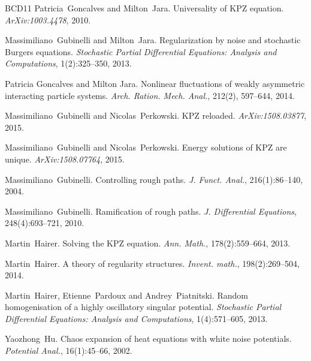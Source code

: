 \documentclass[a4paper,11pt]{article}
\newcommand{\tmtextit}[1]{{\itshape{#1}}}
\begin{document}
\begin{thebibliography}{BCD11}
  Patricia~Goncalves  and 
  Milton~Jara.{\newblock} Universality of KPZ equation.{\newblock}
  \tmtextit{ArXiv:1003.4478}, 2010.{\newblock}
  
  Massimiliano~Gubinelli  and 
  Milton~Jara.{\newblock} Regularization by noise and stochastic Burgers
  equations.{\newblock} \tmtextit{Stochastic Partial Differential Equations:
  Analysis and Computations}, 1(2):325--350, 2013.{\newblock}
  
  Patricia Goncalves and Milton Jara.{\newblock} Nonlinear fluctuations of weakly asymmetric interacting particle systems. {\newblock} \tmtextit{Arch. Ration. Mech. Anal.}, 212(2), 597--644, 2014.{\newblock}
  
  Massimiliano~Gubinelli  and 
  Nicolas~Perkowski.{\newblock} KPZ reloaded.{\newblock} \tmtextit{ArXiv:1508.03877},  2015.{\newblock}

  Massimiliano~Gubinelli  and 
  Nicolas~Perkowski.{\newblock} Energy solutions of KPZ are unique.{\newblock} 	\tmtextit{ArXiv:1508.07764},  2015.{\newblock}
  
  Massimiliano~Gubinelli.{\newblock} Controlling
  rough paths.{\newblock} \tmtextit{J. Funct. Anal.}, 216(1):86--140, 
  2004.{\newblock}
  
  Massimiliano~Gubinelli.{\newblock}
  Ramification of rough paths.{\newblock} \tmtextit{J. Differential
  Equations}, 248(4):693--721, 2010.{\newblock}
  
  Martin~Hairer.{\newblock} Solving the KPZ
  equation.{\newblock} \tmtextit{Ann. Math.}, 178(2):559--664,
  2013.{\newblock}
  
  Martin~Hairer.{\newblock} A theory of regularity
  structures.{\newblock} \tmtextit{Invent. math.}, 198(2):269--504, 2014.{\newblock}
  
  Martin~Hairer, Etienne~Pardoux  and 
  Andrey~Piatnitski.{\newblock} Random homogenisation of a highly oscillatory
  singular potential.{\newblock} \tmtextit{Stochastic Partial Differential
  Equations: Analysis and Computations}, 1(4):571--605, 2013.{\newblock}
  
  Yaozhong~Hu.{\newblock} Chaos expansion of heat
  equations with white noise potentials.{\newblock} \tmtextit{Potential
  Anal.}, 16(1):45--66, 2002.{\newblock}
  

\end{thebibliography}
\end{document}
